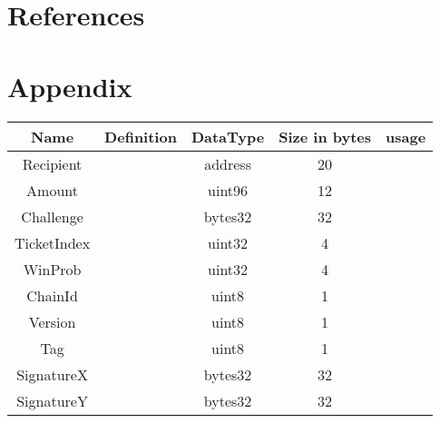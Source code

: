 \section{References}

\section{Appendix}

    \begin{tabular}{ c | c | c | c | c}
    Name & Definition & DataType & Size in bytes & usage\\ \hline
    Recipient & &address & 20 & \\  
    Amount & &uint96 & 12 &  \\
    Challenge & &bytes32 & 32 & \\
    TicketIndex & &uint32 & 4 & \\
    WinProb & &uint32 & 4 & \\
    ChainId & &uint8 & 1 & \\
    Version & &uint8 & 1 & \\
    Tag & &uint8 & 1 & \\
    SignatureX & &bytes32 & 32 & \\
    SignatureY & &bytes32 & 32 & 
    \end{tabular}


